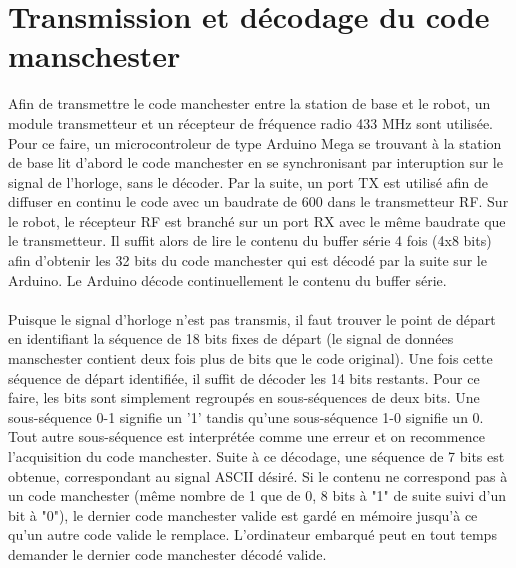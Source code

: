 \section{Transmission et décodage du code manschester}

Afin de transmettre le code manchester entre la station de base et le robot, un module transmetteur et un récepteur de fréquence radio 433 MHz sont utilisée.
Pour ce faire, un microcontroleur de type Arduino Mega se trouvant à la station de base lit d'abord le code manchester en se synchronisant par interuption
sur le signal de l'horloge, sans le décoder. Par la suite, un port TX est utilisé afin de diffuser en continu le code avec un baudrate de 600 dans le transmetteur
RF. Sur le robot, le récepteur RF est branché sur un port RX avec le même baudrate que le transmetteur. Il suffit alors de lire le contenu du buffer
série 4 fois (4x8 bits) afin d'obtenir les 32 bits du code manchester qui est décodé par la suite sur le Arduino. Le Arduino décode continuellement le
contenu du buffer série.
\paragraph{}
Puisque le signal d'horloge n'est pas transmis, il faut trouver le point de départ en identifiant la séquence de 18 bits fixes de départ
(le signal de données manschester contient deux fois plus de bits que le code original). Une fois cette séquence de départ identifiée,
il suffit de décoder les 14 bits restants. Pour ce faire, les bits sont simplement regroupés en sous-séquences de deux bits.
Une sous-séquence 0-1 signifie un '1' tandis qu'une sous-séquence 1-0 signifie un 0. Tout autre sous-séquence est interprétée comme une erreur et on recommence
l'acquisition du code manchester. Suite à ce décodage, une séquence de 7 bits est obtenue, correspondant au signal ASCII désiré. Si le contenu ne correspond
pas à un code manchester (même nombre de 1 que de 0, 8 bits à "1" de suite suivi d'un bit à "0"), le dernier code manchester valide est
gardé en mémoire jusqu'à ce qu'un autre code valide le remplace. L'ordinateur embarqué peut en tout temps demander le dernier code manchester décodé valide.
